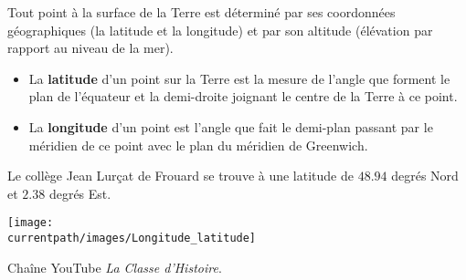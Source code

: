 \vspace*{-5mm} 

\vspace*{-5mm} 
\medskip

\begin{debat}
    Tout point à la surface de la Terre est déterminé par ses coordonnées géographiques (la latitude et la longitude) et par son altitude (élévation par rapport au niveau de la mer). \\
    \begin{minipage}{10.5cm}
       \begin{itemize}
          \item La {\bf latitude} d'un point sur la Terre est la mesure de l'angle que forment le plan de l'équateur et la demi-droite joignant le centre de la Terre à ce point.
          \item La {\bf longitude} d'un point est l'angle que fait le demi-plan passant par le méridien de ce point avec le plan du méridien de Greenwich.
       \end{itemize}
       Le collège Jean Lurçat de Frouard se trouve à une latitude de $\num{48.94}$ degrés Nord et $\num{2.38}$ degrés Est.
    \end{minipage}
    \hfill
    \begin{minipage}{5cm}
       \texttt{[image: \\currentpath/images/Longitude\_latitude]}
    \end{minipage} 
    \bigskip
    \begin{cadre}[B2][F4]
       \begin{center}

          Chaîne YouTube {\it La Classe d'Histoire}.
       \end{center}
    \end{cadre}
\end{debat}